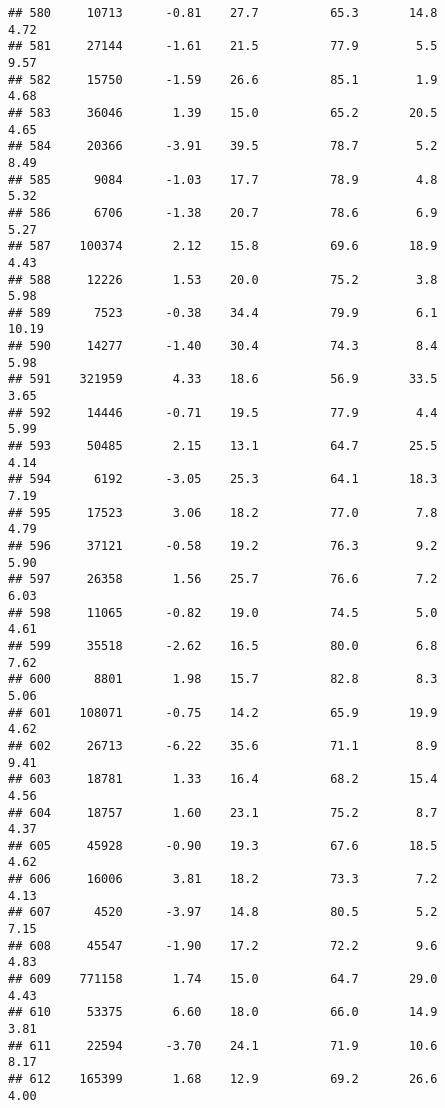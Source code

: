 \documentclass[
]{article}
\begin{document}
\begin{verbatim}
## 580     10713      -0.81    27.7          65.3       14.8              4.72
## 581     27144      -1.61    21.5          77.9        5.5              9.57
## 582     15750      -1.59    26.6          85.1        1.9              4.68
## 583     36046       1.39    15.0          65.2       20.5              4.65
## 584     20366      -3.91    39.5          78.7        5.2              8.49
## 585      9084      -1.03    17.7          78.9        4.8              5.32
## 586      6706      -1.38    20.7          78.6        6.9              5.27
## 587    100374       2.12    15.8          69.6       18.9              4.43
## 588     12226       1.53    20.0          75.2        3.8              5.98
## 589      7523      -0.38    34.4          79.9        6.1             10.19
## 590     14277      -1.40    30.4          74.3        8.4              5.98
## 591    321959       4.33    18.6          56.9       33.5              3.65
## 592     14446      -0.71    19.5          77.9        4.4              5.99
## 593     50485       2.15    13.1          64.7       25.5              4.14
## 594      6192      -3.05    25.3          64.1       18.3              7.19
## 595     17523       3.06    18.2          77.0        7.8              4.79
## 596     37121      -0.58    19.2          76.3        9.2              5.90
## 597     26358       1.56    25.7          76.6        7.2              6.03
## 598     11065      -0.82    19.0          74.5        5.0              4.61
## 599     35518      -2.62    16.5          80.0        6.8              7.62
## 600      8801       1.98    15.7          82.8        8.3              5.06
## 601    108071      -0.75    14.2          65.9       19.9              4.62
## 602     26713      -6.22    35.6          71.1        8.9              9.41
## 603     18781       1.33    16.4          68.2       15.4              4.56
## 604     18757       1.60    23.1          75.2        8.7              4.37
## 605     45928      -0.90    19.3          67.6       18.5              4.62
## 606     16006       3.81    18.2          73.3        7.2              4.13
## 607      4520      -3.97    14.8          80.5        5.2              7.15
## 608     45547      -1.90    17.2          72.2        9.6              4.83
## 609    771158       1.74    15.0          64.7       29.0              4.43
## 610     53375       6.60    18.0          66.0       14.9              3.81
## 611     22594      -3.70    24.1          71.9       10.6              8.17
## 612    165399       1.68    12.9          69.2       26.6              4.00

\end{verbatim}
\end{document}
